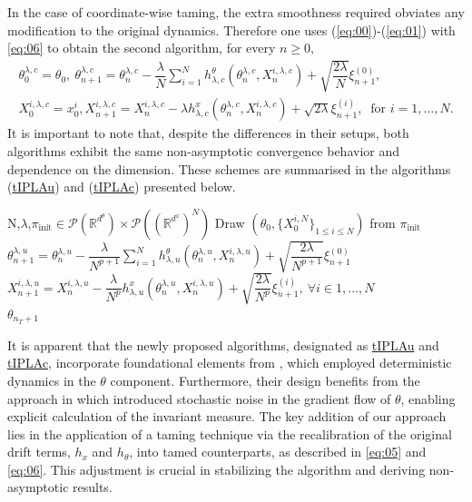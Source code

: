 \documentclass[a4paper, 10pt]{article}
\theoremstyle{plain}%
\begin{document}
In the case of coordinate-wise taming, the extra smoothness required obviates any modification to the original dynamics. Therefore one uses (\ref{eq:00})-(\ref{eq:01}) with \eqref{eq:06} to obtain the second algorithm, for every $n\geq0,$
\begin{gather}
\theta^{\lambda,c}_0=\theta_0,\ \theta_{n+1}^{\lambda,c}=\theta_{n}^{\lambda,c}-\dfrac{\lambda}{N}\sum_{i=1}^N h_{\lambda,c}^{\theta}(\theta_{n}^{\lambda,c},X_{n}^{i,\lambda,c})+\sqrt{\dfrac{2\lambda}{N}}\xi^{(0)}_{n+1},\label{eq:09}\\
X^{i,\lambda,c}_0=x^i_0, X_{n+1}^{i,\lambda,c}=X_{n}^{i,\lambda,c}-\lambda h_{\lambda,c}^{x}(\theta_{n}^{\lambda,c},X_{n}^{i,\lambda,c})+\sqrt{2\lambda}\xi^{(i)}_{n+1},\ \text{ for } i=1,\ldots,N.\label{eq:000}
\end{gather}
It is important to note that, despite the differences in their setups, both algorithms exhibit the same non-asymptotic convergence behavior and dependence on the dimension. These schemes are summarised in the algorithms (\hyperref[algo1]{tIPLAu}) and (\hyperref[algo2]{tIPLAc}) presented below.
\begin{algorithm}[h]
    \caption{Tamed interacting  particle Langevin algorithm (tIPLAu)}\label{algo1}
    \begin{algorithmic}
        \Require N,$\lambda$,$\pi_{\text{init}}\in\mathcal{P}(\mathbb{R}^{d^{\theta}})\times\mathcal{P}((\mathbb{R}^{d^x})^N)$
        \State Draw $(\theta_0,\{X_0^{i,N}\}_{1\leq i\leq N})$ from $\pi_{\text{init}}$
            \State $\theta_{n+1}^{\lambda,u}=\theta_{n}^{\lambda,u}-\dfrac{\lambda}{N^{p+1}}\sum_{i=1}^N h^{\theta}_{\lambda,u}(\theta_{n}^{\lambda,u},X_{n}^{i,\lambda,u})+\sqrt{\dfrac{2\lambda}{N^{p+1}}}\xi^{(0)}_{n+1}$\\
            \State $X_{n+1}^{i,\lambda,u}=X_{n}^{i,\lambda,u}-\dfrac{\lambda}{N^p}h^{x}_{\lambda,u}(\theta_{n}^{\lambda,u},X_{n}^{i,\lambda,u})+\sqrt{\dfrac{2\lambda}{N^p}}\xi^{(i)}_{n+1},\ \forall i\in{1,...,N}$
        \EndFor\\
        \Return $\theta_{n_T+1}$
    \end{algorithmic}
\end{algorithm}
It is apparent that the newly proposed algorithms, designated as \hyperref[algo1]{tIPLAu} and \hyperref[algo2]{tIPLAc}, incorporate foundational elements from \cite{Kuntz}, which employed deterministic dynamics in the $\theta$ component. Furthermore, their design benefits from the approach in \cite{Ipla} which introduced stochastic noise in the gradient flow of $\theta$, enabling explicit calculation of the invariant measure. The key addition of our approach lies in the application of a taming technique via the recalibration of the original drift terms, $h_x$ and $h_{\theta}$, into tamed counterparts, as described in \eqref{eq:05} and \eqref{eq:06}. This adjustment is crucial in stabilizing the algorithm and deriving non-asymptotic results.
\end{document}
